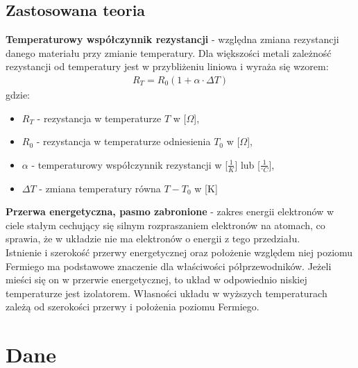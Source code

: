\documentclass[11pt]{article}
\begin{document}
    \subsection*{Zastosowana teoria}
    \textbf{Temperaturowy współczynnik rezystancji} - względna zmiana rezystancji danego materiału przy zmianie temperatury.
    Dla większości metali zależność rezystancji od temperatury jest w przybliżeniu liniowa i wyraża się wzorem:
    \begin{gather*}
        R_T=R_0(1+\alpha\cdot\Delta T)
    \end{gather*}
    gdzie:
        {\footnotesize
    \begin{itemize}
        \item[] $R_T$ -  rezystancja w temperaturze $T$ w [$\Omega$],
        \item[] $R_0$ -  rezystancja w temperaturze odniesienia $T_0$ w [$\Omega$],
        \item[] $\alpha$ - temperaturowy współczynnik rezystancji w [$\frac{1}{K}$] lub [$\frac{1}{^\circ C}$],
        \item[] $\Delta T$ - zmiana temperatury równa $T-T_0$ w [K]
    \end{itemize}}
    \noindent\textbf{Przerwa energetyczna, pasmo zabronione} - zakres energii elektronów w ciele stałym cechujący się
    silnym rozpraszaniem elektronów na atomach, co sprawia, że w układzie nie ma elektronów o energii z tego przedziału.\\
    \indent Istnienie i szerokość przerwy energetycznej oraz położenie względem niej poziomu Fermiego ma podstawowe znaczenie dla
    właściwości półprzewodników. Jeżeli mieści się on w przerwie energetycznej, to układ w odpowiednio niskiej
    temperaturze jest izolatorem. Własności układu w wyższych temperaturach zależą od szerokości przerwy i położenia poziomu Fermiego.

    \section{Dane}
    \begin{center}
    \end{center}
\end{document}
